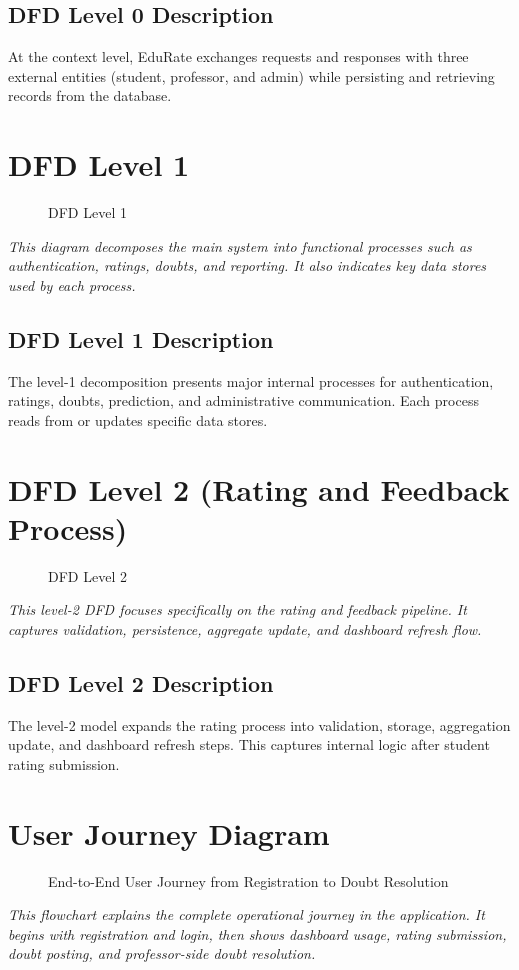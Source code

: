 \subsection*{DFD Level 0 Description}
At the context level, EduRate exchanges requests and responses with three external entities (student, professor, and admin) while persisting and retrieving records from the database.

\section{DFD Level 1}
\begin{figure}[H]
\centering

\caption{DFD Level 1}
\end{figure}
\noindent\textit{This diagram decomposes the main system into functional processes such as authentication, ratings, doubts, and reporting. It also indicates key data stores used by each process.}

\subsection*{DFD Level 1 Description}
The level-1 decomposition presents major internal processes for authentication, ratings, doubts, prediction, and administrative communication. Each process reads from or updates specific data stores.

\section{DFD Level 2 (Rating and Feedback Process)}
\begin{figure}[H]
\centering

\caption{DFD Level 2}
\end{figure}
\noindent\textit{This level-2 DFD focuses specifically on the rating and feedback pipeline. It captures validation, persistence, aggregate update, and dashboard refresh flow.}

\subsection*{DFD Level 2 Description}
The level-2 model expands the rating process into validation, storage, aggregation update, and dashboard refresh steps. This captures internal logic after student rating submission.

\section{User Journey Diagram}
\begin{figure}[H]
\centering

\caption{End-to-End User Journey from Registration to Doubt Resolution}
\end{figure}
\noindent\textit{This flowchart explains the complete operational journey in the application. It begins with registration and login, then shows dashboard usage, rating submission, doubt posting, and professor-side doubt resolution.}

